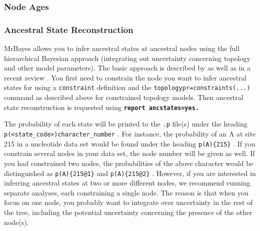\documentclass[12pt]{book}
\newcommand{\ttt}[1]{\texttt{#1} }
\newcommand{\tb}[1]{\texttt{\textbf{#1}} }
\begin{document}
\subsubsection{Node Ages}

\subsubsection{Ancestral State Reconstruction}
MrBayes allows you to infer ancestral states at ancestral nodes using the full hierarchical
Bayesian approach (integrating out uncertainty concerning topology and other model parameters). The
basic approach is described by \citet{huelsenbeck01a} as well as in a recent review
\citep{ronquist04a}. You first need to constrain the node you want to infer ancestral states for
using a \ttt{constraint} definition and the \ttt{topologypr=constraints(...)} command as described
above for constrained topology models. Then ancestral state reconstruction is requested using
\tb{report ancstates=yes.}

The probability of each state will be printed to the \ttt{.p} file(s) under the heading
\ttt{p(<state\_code>){character\_number}}. For instance, the probability of an A at site 215 in a
nucleotide data set would be found under the heading \ttt{p(A)\{215\}}. If you constrain several
nodes in your data set, the node number will be given as well. If you had constrained two nodes,
the probabilities of the above character would be distinguished as \ttt{p(A)\{215@1\}} and
\ttt{p(A)\{215@2\}}. However, if you are interested in inferring ancestral states at two or more
different nodes, we recommend running separate analyses, each constraining a single node. The
reason is that when you focus on one node, you probably want to integrate over uncertainty in the
rest of the tree, including the potential uncertainty concerning the presence of the other node(s).
\end{document}
